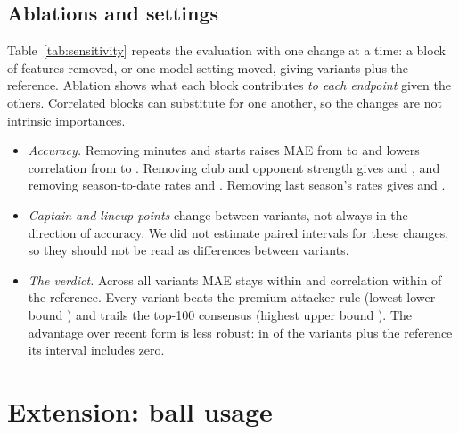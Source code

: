 \documentclass[11pt,a4paper]{article}
\begin{document}
\subsection{Ablations and settings}\label{sec:sensitivity}
Table~\ref{tab:sensitivity} repeats the evaluation with one change at a time: a block of features
removed, or one model setting moved, giving \nVariants{} variants plus the reference. Ablation
shows what each block contributes \emph{to each endpoint} given the others. Correlated blocks can
substitute for one another, so the changes are not intrinsic importances.
\begin{itemize}
  \item \emph{Accuracy.} Removing minutes and starts raises MAE from  to \ablMinsMae{} and
        lowers correlation from  to \ablMinsCorr{}. Removing club and opponent strength
        gives \ablClubMae{} and \ablClubCorr{}, and removing season-to-date rates \ablSeasonMae{}
        and \ablSeasonCorr{}. Removing last season's rates gives \ablPriorMae{} and \ablPriorCorr{}.
  \item \emph{Captain and lineup points} change between variants, not always in the direction of
        accuracy. We did not estimate paired intervals for these changes, so they should not be read
        as differences between variants.
  \item \emph{The verdict.} Across all variants MAE stays within \sensMaeSpread{} and correlation
        within \sensCorrSpread{} of the reference. Every variant beats the premium-attacker rule
        (lowest lower bound \sensPremLowMin) and trails the top-100 consensus (highest upper bound
        \sensEliteHighMax). The advantage over recent form is less robust: in \sensFormFail{} of the
        \nVariants{} variants plus the reference its interval includes zero.
\end{itemize}

\begin{table}[ht]
\centering
\small
\caption{Ablations and settings. MAE and correlation over test player-weeks; captain points per
week; the captain's mean weekly difference from the top-100 and premium comparators; and the
lower end of its interval against recent form.}
\label{tab:sensitivity}

\end{table}

\section{Extension: ball usage}\label{sec:usage}
\end{document}
